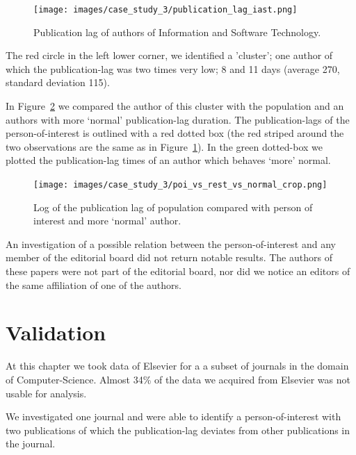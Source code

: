 \documentclass{ou-report}
\newcommand{\outline}[1]{{\color{blue} #1}}
\begin{document}
\begin{figure}[H]
    \centering
    \texttt{[image: images/case\_study\_3/publication\_lag\_iast.png]}
    \caption{Publication lag of authors of Information and Software Technology.}
    \label{fig:cs3_publag_iast}
\end{figure}

The red circle in the left lower corner, we identified a 'cluster'; one author
of which the publication-lag was two times very low; 8 and 11 days (average
270, standard deviation 115). 

In Figure~\ref{fig:cs3_pop_vs_poi} we compared the author of this cluster with
the population and an authors with more `normal' publication-lag duration. 
The publication-lags of the person-of-interest is outlined with a red dotted box
(the red striped around the two observations are the same as in
Figure~\ref{fig:cs3_publag_iast}).
In the green dotted-box we plotted the publication-lag times of an author which
behaves `more' normal.

\begin{figure}[H]
    \centering
    \texttt{[image: images/case\_study\_3/poi\_vs\_rest\_vs\_normal\_crop.png]}
    \caption{Log of the publication lag of population compared with person of interest and more `normal' author.}
    \label{fig:cs3_pop_vs_poi}
\end{figure}

An investigation of a possible relation between the person-of-interest and any
member of the editorial board did not return notable results. The authors of
these papers were not part of the editorial board, nor did we notice an editors
of the same affiliation of one of the authors.


\section{Validation}
At this chapter we took data of Elsevier for a a subset of journals in the
domain of Computer-Science. Almost 34\% of the data we acquired from Elsevier 
was not usable for analysis. 

We investigated one journal and were able to identify a 
person-of-interest with two publications of which the publication-lag deviates
from other publications in the journal.
\end{document}
